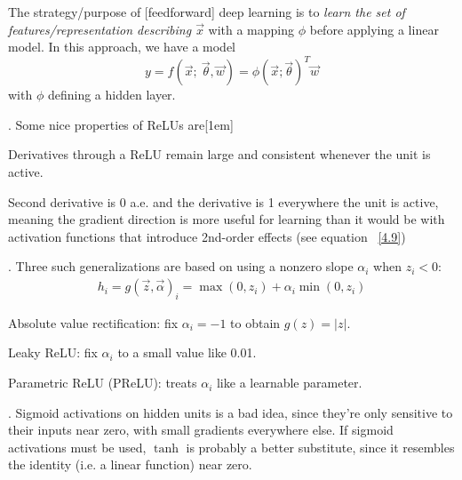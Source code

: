 \documentclass[11pt]{article}
\begin{document}
\label{Modern Practices}





The strategy/purpose of [feedforward] deep learning is to \textit{learn the set of features/representation describing $\vec{x}$} with a mapping $\phi$ before applying a linear model. In this approach, we have a model 
\[
	y = f(\vec{x}; ~ \vec{\theta}, \vec{w}) = \phi(\vec{x}; \vec{\theta})^T \vec{w}
\]
with $\phi$ defining a hidden layer.

\myspace
\p {}. Some nice properties of ReLUs are\textellipsis{}[1em]
\begin{compactitem}
	\item Derivatives through a ReLU remain large and consistent whenever the unit is active. 
	\item Second derivative is 0 a.e. and the derivative is 1 everywhere the unit is active, meaning the gradient direction is more useful for learning than it would be with activation functions that introduce 2nd-order effects (see equation ~\ref{4.9})
\end{compactitem}

\myspace
\p {}. Three such generalizations are based on using a nonzero slope $\alpha_i$ when $z_i < 0$:
\begin{align}
	h_i = g(\vec{z}, \vec{\alpha})_i = \max(0, z_i) + \alpha_i \min(0, z_i)
\end{align}
\begin{compactitem}[$\rightarrow$]
	\item Absolute value rectification: fix $\alpha_i = -1$ to obtain $g(z) = |z|$. 
	\item Leaky ReLU: fix $\alpha_i$ to a small value like 0.01.
	\item Parametric ReLU (PReLU): treats $\alpha_i$ like a learnable parameter.
\end{compactitem}

\myspace
\p {}. Sigmoid activations on hidden units is a bad idea, since they're only sensitive to their inputs near zero, with small gradients everywhere else. If sigmoid activations must be used, $\tanh$ is probably a better substitute, since it resembles the identity (i.e. a linear function) near zero. 
\end{document}
